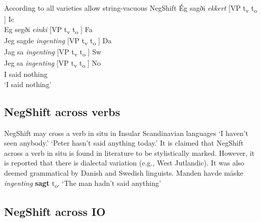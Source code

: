 \documentclass[12pt, letterpaper]{article}
\begin{document}
\ea According to \citeauthor{engelsScandinavianNegativeIndefinites2012} all varieties allow string-vacuous NegShift
	\ea 
	\gllllll Ég sagði \textit{ekkert} [VP t\textsubscript{v}  t\textsubscript{o}  ] Ic\\
			Eg segði \textit{einki} [VP t\textsubscript{v}  t\textsubscript{o}  ] Fa\\
			Jeg sagde \textit{ingenting} [VP t\textsubscript{v}  t\textsubscript{o}  ] Da \\
			Jag sa \textit{ingenting} [VP t\textsubscript{v}  t\textsubscript{o}  ] Sw\\
			Jeg sa \textit{ingenting} [VP t\textsubscript{v}  t\textsubscript{o}  ] No\\
			I said nothing\\
	\glt `I said nothing'
	\z 
\z

\subsection{NegShift across verbs}

\ea NegShift may cross a verb in situ in Insular Scandinavian languages
	\glt `I haven't seen anybody.'%
	\glt `Peter hasn't said anything today.'%
	\z 
\ex It is claimed that NegShift across a verb in situ is found in literature to be stylistically marked. However, it is reported that there is dialectal variation (e.g., West Jutlandic). It was also deemed grammatical by Danish and Swedish linguists.
	\ea Manden havde måske \textit{ingenting} \textbf{sagt} t\textsubscript{o}.
	\glt `The man hadn't said anything'
	\z 
\z 

\subsection{NegShift across IO}
\end{document}
